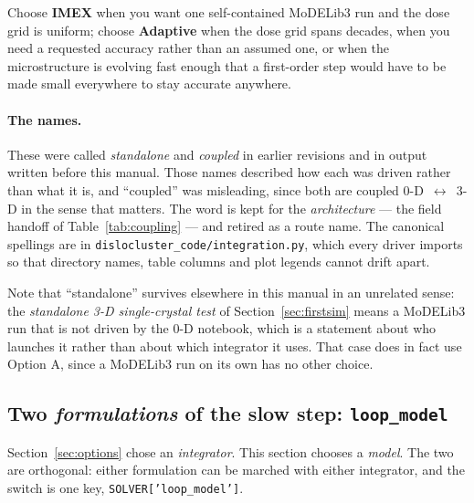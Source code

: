 \documentclass[11pt]{article}
\newcommand{\MoD}{\textsf{MoDELib3}}
\newcommand{\code}[1]{\texttt{\small #1}}
\begin{document}
Choose \textbf{IMEX} when you want one self-contained \MoD{} run and the dose
grid is uniform; choose \textbf{Adaptive} when the dose grid spans decades, when
you need a requested accuracy rather than an assumed one, or when the
microstructure is evolving fast enough that a first-order step would have to be
made small everywhere to stay accurate anywhere.

\paragraph{The names.} These were called \emph{standalone} and \emph{coupled}
in earlier revisions and in output written before this manual. Those names
described how each was driven rather than what it is, and ``coupled'' was
misleading, since both are coupled 0-D~$\leftrightarrow$~3-D in the sense that
matters. The word is kept for the \emph{architecture} --- the field handoff of
Table~\ref{tab:coupling} --- and retired as a route name. The canonical
spellings are in \code{dislocluster\_code/integration.py}, which every driver
imports so that directory names, table columns and plot legends cannot drift
apart.

Note that ``standalone'' survives elsewhere in this manual in an unrelated
sense: the \emph{standalone 3-D single-crystal test} of
Section~\ref{sec:firstsim} means a \MoD{} run that is not driven by the 0-D
notebook, which is a statement about who launches it rather than about which
integrator it uses. That case does in fact use Option A, since a \MoD{} run on
its own has no other choice.

\subsection{Two \emph{formulations} of the slow step: \code{loop\_model}}
\label{sec:loopmodel}

Section~\ref{sec:options} chose an \emph{integrator}. This section chooses a
\emph{model}. The two are orthogonal: either formulation can be marched with
either integrator, and the switch is one key,
\code{SOLVER['loop\_model']}.
\end{document}
